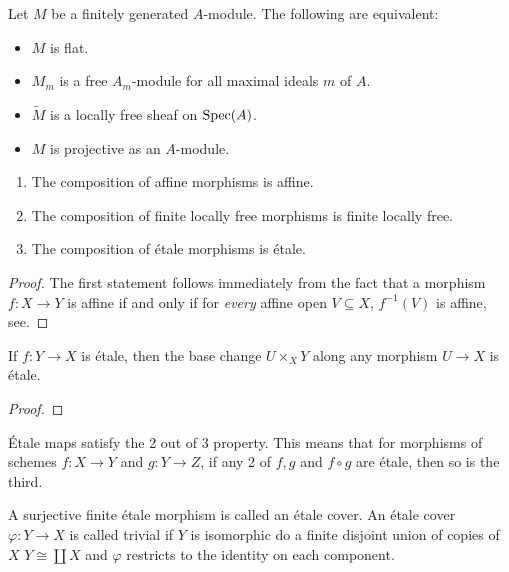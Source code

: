 Let $M$ be a finitely generated $A$-module. The following are equivalent:
\begin{itemize}
	\item $M$ is flat.
	\item $M_m$ is a free $A_m$-module for all maximal ideals $m$ of $A$.
	\item $\widetilde{M}$ is a locally free sheaf on $\operatorname{Spec}(A)$.
	\item $M$ is projective as an $A$-module.
\end{itemize}

\begin{lemma}
	\begin{enumerate}
		\item The composition of affine morphisms is affine.
		\item The composition of finite locally free morphisms is finite locally free.
		\item The composition of \'etale morphisms is \'etale.
	\end{enumerate}
\end{lemma}

\begin{proof}
	The first statement follows immediately from the fact that a morphism $f: X \to Y$ is affine if and only if for \textit{every} affine open $V \subseteq X$, $f^{-1}(V)$ is affine, see\cite{Hartshorne}.
\end{proof}

\begin{lemma}
	If $f: Y \to X$ is \'etale, then the base change $U \times_X Y$ along any morphism $U \to X$ is \'etale.
\end{lemma}

\begin{proof}

\end{proof}

\begin{remark}
	\'Etale maps satisfy the 2 out of 3 property. This means that for morphisms of schemes $f \colon X \to Y$ and $g \colon Y \to Z$, if any 2 of $f, g$ and $f \circ g$ are \'etale, then so is the third.
\end{remark}

\begin{definition}
	A surjective finite \'etale morphism is called an \'etale cover. An \'etale cover $\varphi : Y \to X$ is called trivial if $Y$ is isomorphic do a finite disjoint union of copies of $X$ $Y \cong \coprod X$ and $\varphi$ restricts to the identity on each component.
\end{definition}

